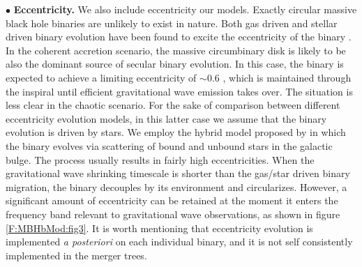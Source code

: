 \documentclass{iopart}
\begin{document}
$\bullet$  {\bf Eccentricity.} We also include eccentricity our models. Exactly circular massive black hole
binaries are unlikely to exist in nature. Both gas driven and stellar driven
binary evolution have been found to excite the eccentricity of the binary
\cite{cuadra,roedig,sesana}. In the coherent 
accretion scenario, the massive circumbinary disk is likely to be also 
the dominant source of secular binary evolution. In this case, the 
binary is expected to 
achieve a limiting eccentricity of $\sim0.6$ \cite{roedig}, which
is maintained through the inspiral until efficient gravitational wave  
emission takes over.
The situation is less clear in the chaotic scenario. For the sake of 
comparison between different eccentricity evolution models, in this latter 
case we assume that the binary evolution is driven by stars. We employ 
the hybrid model proposed by \cite{sesana} in which the binary evolves 
via scattering of bound and unbound stars in the galactic bulge. The 
process usually results in fairly high eccentricities. When the gravitational
wave shrinking timescale is shorter than the gas/star driven binary migration,
the binary decouples by its environment and circularizes. However, a
significant amount of eccentricity can be retained at the moment it
enters the frequency band relevant to gravitational wave observations, 
as shown in figure \ref{F:MBHbMod:fig3}. It is worth mentioning that eccentricity 
evolution is implemented {\it a posteriori} on each individual binary, 
and it is not self consistently implemented in the merger trees.

 



\end{document}
